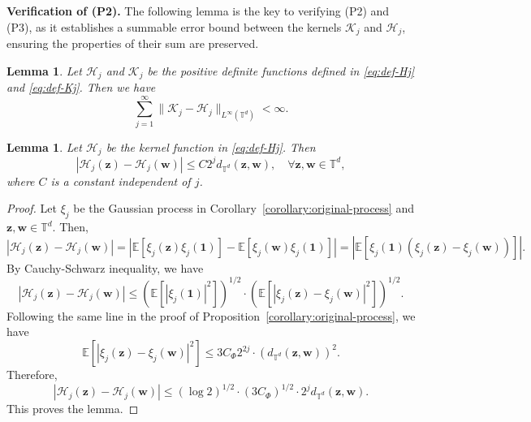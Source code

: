 \documentclass[12pt]{amsart}
\newtheorem{lemma}[theorem]{Lemma}
\theoremstyle{definition}
\theoremstyle{remark}
\newcommand{\bz}{\boldsymbol{z}}
\newcommand{\bw}{\boldsymbol{w}}
\newcommand{\E}{\mathbb{E}}
\newcommand{\T}{\mathbb{T}}
\numberwithin{equation}{section}
\begin{document}
\medskip
{\flushleft \bf Verification of (P2). }
The following lemma is the key to verifying (P2) and (P3), as it establishes a summable error bound between the kernels $\mathcal{K}_j$ and $\mathcal{H}_j$, ensuring the properties of their sum are preserved.
\begin{lemma}\label{lemma:convergence-difference}
	Let $\mathcal{H}_j$ and $\mathcal{K}_j$ be the positive definite functions defined in \eqref{eq:def-Hj} and \eqref{eq:def-Kj}.
	Then we have
	 \[
	 \sum_{j=1}^\infty \|\mathcal{K}_j-\mathcal{H}_j\|_{L^\infty(\T^d)}<\infty.
	 \]
\end{lemma}
\begin{lemma}\label{lemma:Lipschitz-continuity-kernel}
    Let $\mathcal{H}_j$ be the kernel function in \eqref{eq:def-Hj}. Then
	\[
	|\mathcal{H}_j(\bz)-\mathcal{H}_j(\bw)|\le C 2^jd_{\T^d}(\bz,\bw),\quad \forall \bz,\bw\in \T^d,
	\]
	where $C$ is a constant independent of $j$.
\end{lemma}
\begin{proof}
	Let $\xi_j$ be the Gaussian process in Corollary~\ref{corollary:original-process} and $\bz,\bw\in \T^d$. Then, 
	\[
	|\mathcal{H}_j(\bz)-\mathcal{H}_j(\bw)|=|\E[\xi_j(\bz)\xi_j(\boldsymbol{1})]-\E[\xi_j(\bw)\xi_j(\boldsymbol{1})]|=
	|\E[\xi_j(\boldsymbol{1})(\xi_j(\bz)-\xi_j(\bw))]|.
	\]
	By Cauchy-Schwarz inequality, we have
	\[
	|\mathcal{H}_j(\bz)-\mathcal{H}_j(\bw)|\le (\E[|\xi_j(\boldsymbol{1})|^2])^{1/2}\cdot (\E[|\xi_j(\bz)-\xi_j(\bw)|^2])^{1/2}.
	\]
	Following the same line in the proof of Proposition~\ref{corollary:original-process}, we have
	\[
	\E[|\xi_j(\bz)-\xi_j(\bw)|^2]\le 3C_\Phi 2^{2j}\cdot (d_{\T^d}(\bz,\bw))^2.
	\]
	Therefore,
	\[
	|\mathcal{H}_j(\bz)-\mathcal{H}_j(\bw)|\le (\log 2)^{1/2}\cdot (3C_\Phi )^{1/2}\cdot 2^j d_{\T^d}(\bz,\bw).
	\]
	This proves the lemma.
\end{proof}
\end{document}
